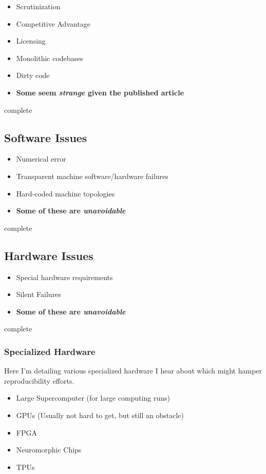\documentclass[american]{article}
\newcommand{\complete}{
	\gls{complete}
}
\begin{document}
\begin{itemize}
\item Scrutinization
\item Competitive Advantage
\item Licensing
\item Monolithic codebases
\item Dirty code
\item \textbf{Some seem \textit{strange} given the published article}
\end{itemize}

\complete

\subsection{Software Issues}

\begin{itemize}
\item Numerical error
\item Transparent machine software/hardware failures
\item Hard-coded machine topologies
\item \textbf{Some of these are \textit{unavoidable}}
\end{itemize}

\complete

\subsection{Hardware Issues}

\begin{itemize}
\item Special hardware requirements
\item Silent Failures
\item \textbf{Some of these are \textit{unavoidable}}
\end{itemize}

\complete

\subsubsection{Specialized Hardware}

Here I'm detailing various specialized hardware I hear about which might hamper reproducibility efforts.

\begin{itemize}
\item Large Supercomputer (for large computing runs)
\item GPUs (Usually not hard to get, but still an obstacle)
\item FPGA
\item Neuromorphic Chips \cite{neuromorphic-chips-webarticle}
\item TPUs \cite{jouppi-tpu-performance-2017}
\end{itemize}
\end{document}
